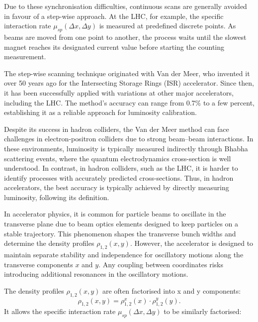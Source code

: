 Due to these synchronisation difficulties, continuous scans are generally avoided in favour of a step-wise approach. At the LHC, for example, the specific interaction rate $\mu_{sp}(\Delta x,\Delta y)$ is measured at predefined discrete points. As beams are moved from one point to another, the process waits until the slowest magnet reaches its designated current value before starting the counting measurement.

The step-wise scanning technique originated with Van der Meer, who invented it over 50 years ago for the Intersecting Storage Rings (ISR) accelerator\cite{Carboni:156499}. Since then, it has been successfully applied with variations at other major accelerators\cite{Rubbia:1025746}, including the LHC. The method's accuracy can range from 0.7\% to a few percent, establishing it as a reliable approach for luminosity calibration.

Despite its success in hadron colliders, the Van der Meer method can face challenges in electron-positron colliders due to strong beam–beam interactions. In these environments, luminosity is typically measured indirectly through Bhabha scattering events, where the quantum electrodynamics cross-section is well understood. In contrast, in hadron colliders, such as the LHC, it is harder to identify processes with accurately predicted cross-sections. Thus, in hadron accelerators, the best accuracy is typically achieved by directly measuring luminosity, following its definition.

In accelerator physics, it is common for particle beams to oscillate in the transverse plane due to beam optics elements designed to keep particles on a stable trajectory. This phenomenon shapes the transverse bunch widths and determine the density profiles $\rho _{1,2}(x, y)$. However, the accelerator is designed to maintain separate stability and independence for oscillatory motions along the transverse components $x$ and $y$. Any coupling between coordinates risks introducing additional resonances in the oscillatory motions.

The density profiles $\rho _{1,2}(x, y)$ are often factorised into x and y components:
\begin{equation}
\rho _{1,2}(x, y) = \rho _{1,2}^x(x) \cdot \rho _{1,2}^y(y).
\end{equation}
It allows the specific interaction rate $\mu_{sp}(\Delta x, \Delta y)$ to be similarly factorised:

